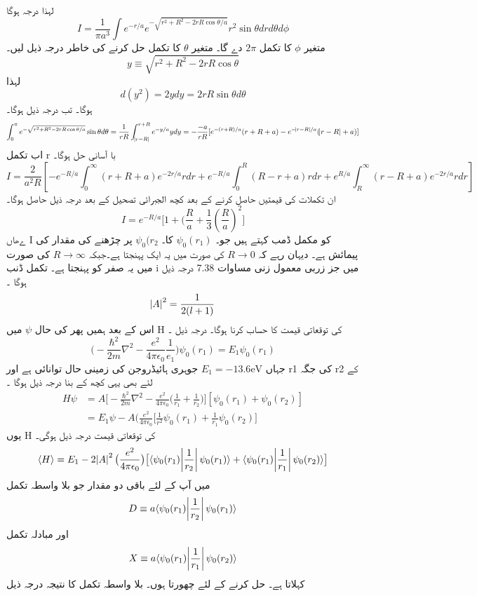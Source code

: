 %
لہذا درجہ ہوگا \\
\[I=\frac{1}{\pi a^{3}}\int e^{-r/a}e^{-\sqrt{r^{2}+R^{2}-2rR\cos{\theta/a}}}r^{2}\sin{\theta}drd\theta d\phi\]
متغیر 
\(\phi\)
 کا تکمل 
 \(2\pi\)
  دے گا۔ متغیر 
  \(\theta\)
   کا تکمل حل کرنے کی خاطر درجہ ذیل لیں۔\\
\[y\equiv\sqrt{r^{2}+R^{2}-2rR\cos{\theta}}\]
لہذا 
\[d(y^{2})=2ydy=2rR\sin{\theta}d\theta\]
ہوگا۔ تب درجہ ذیل ہوگا۔
\[\int_{0}^{\pi}e^{-\sqrt{r^{2}+R^{2}-2rR\cos{\theta/a}}}\sin{\theta}d\theta=\frac{1}{rR}\int_{\abs{r-R}}^{r+R}e^{-y/a}ydy=-\frac{-a}{rR}[e^{-(r+R)/a}(r+R+a)-e^{-\abs{r-R}/a}(\abs{r-R}+a)]\]
اب تکمل r با آسانی حل ہوگا۔ 
\[I=\frac{2}{a^{2}R}[-e^{-R/a}\int_{0}^{\infty}(r+R+a)e^{-2r/a}rdr+e^{-R/a}\int_{0}^{R}(R-r+a)rdr+e^{R/a}\int_{R}^{\infty}(r-R+a)e^{-2r/a}rdr]\]
ان تکملات کی قیمتیں حاصل کرنے کے بعد کچھ الجبرائی تصحیل کے بعد درجہ ذیل حاصل ہوگا۔
\[I=e^{-R/a}\big[1+(\frac{R}{a}+\frac{1}{3}(\frac{R}{a})^{2}\big]\]
ےھاں  ٰI کو مکمل ڈمب کہتے ہیں جو۔
\(\psi_{0}(r_{1})\)
 کا۔
 \(\psi_{0}(r_{2}\)
 پر چڑھنے کی مقدار کی پیمائش ہے۔ دیہان رہے کہ 
 \(R\rightarrow 0\)
  کی صورت میں یہ ایک پہنجتا ہے۔جبکہ 
  \(R\rightarrow \infty\)
   کی صورت میں یہ صفر کو پہنجتا ہے۔ تکمل ڈنب i میں جز زربی معمول زنی مساوات 7.38 درجہ ذیل ہوگا ۔\\
\[\abs{A}^{2}=\frac{1}{2(l+1)}\]
اس کے بعد ہمیں پھر کی حال 
\(\psi\)
 میں H کی توقعاتی قیمت کا حساب کرنا ہوگا۔ درجہ ذیل ۔
 \[\big(-\frac{\hbar^{2}}{2m}\nabla^{2}-\frac{e^{2}}{4\pi\epsilon_{0}}\frac{1}{e_{1}}\big)\psi_{0}(r_{1})=E_{1}\psi_{0}(r_{1})\]
  جہاں 
  \(E_{1}=-13.6\text{eV}\)
  جوہری ہائیڈروجن کی زمینی حال توانائی ہے اور r1 کی جگہ r2 کے لئے بھی یہی کچھ کے بنا  درجہ ذیل ہوگا ۔
\begin{align*}
H\psi&=A\big[-\frac{\hbar^{2}}{2m}\nabla^{2}-\frac{e^{2}}{4\pi\epsilon_{0}}\big(\frac{1}{r_{1}}+\frac{1}{r_{2}}\big)\big][\psi_{0}(r_{1})+\psi_{0}(r_{2})]\\
&=E_{1}\psi-A(\frac{e^{2}}{4\pi\epsilon_{0}}\big[\frac{1}{r^{2}}\psi_{0}(r_{1})+\frac{1}{r_{1}}\psi_{0}(r_{2})\big]
\end{align*}
یوں H کی توقعاتی قیمت درجہ ذیل ہوگی۔
\[\langle H \rangle =E_{1}-2\abs{A}^{2}\big(\frac{e^{2}}{4\pi\epsilon_{0}}\big)\big[\langle \psi_{0}(r_{1})\abs{\frac{1}{r_{2}}}\psi_{0}(r_{1})\rangle +\langle \psi_{0}(r_{1})\abs{\frac{1}{r_{1}}}\psi_{0}(r_{2})\rangle\big]\]
میں آپ کے لئے باقی دو مقدار جو بلا واسطہ تکمل 
\[D\equiv a\langle \psi_{0}(r_{1})\abs{\frac{1}{r_{2}}}\psi_{0}(r_{1})\rangle\]
اور
مبادلہ تکمل 
\[X\equiv a\langle\psi_{0}(r_{1})\abs{\frac{1}{r_{1}}}\psi_{0}(r_{2})\rangle\]
کہلاتا ہے۔ حل کرنے کے لئے چھورتا ہوں۔ بلا واسطہ تکمل کا نتیجہ درجہ ذیل 
